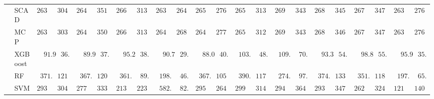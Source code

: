 \begin{tabular}{p{0.2cm}p{1cm}|p{0.6cm}p{0.6cm}|p{0.6cm}p{0.6cm}p{0.6cm}p{0.6cm}p{0.6cm}p{0.6cm}|p{0.6cm}p{0.6cm}p{0.6cm}p{0.6cm}p{0.6cm}p{0.6cm}|p{0.6cm}p{0.6cm}p{0.6cm}p{0.6cm}p{0.6cm}p{0.6cm}}
 & SCAD  & $2637.34$ & $304.57$ & $2643.80$ & $351.02$ & $2663.38$ & $313.00$ & $2631.89$ & $264.31$ & $2651.19$ & $276.21$ & $2658.69$ & $313.58$ & $2692.91$ & $343.54$ & $2683.60$ & $345.53$ & $2677.31$ & $347.32$ & $2638.15$ & $276.77$ \\
 & MCP  & $2635.39$ & $303.10$ & $2644.36$ & $350.02$ & $2665.88$ & $313.43$ & $2640.00$ & $268.58$ & $2648.63$ & $277.54$ & $2657.11$ & $312.85$ & $2697.34$ & $343.94$ & $2681.20$ & $346.18$ & $2676.51$ & $347.17$ & $2639.24$ & $276.32$ \\
 & XGBoost  & $\phantom{00}91.99$ & $\phantom{0}36.47$ & $\phantom{00}89.95$ & $\phantom{0}37.57$ & $\phantom{00}95.22$ & $\phantom{0}38.79$ & $\phantom{00}90.70$ & $\phantom{0}29.18$ & $\phantom{00}88.05$ & $\phantom{0}40.05$ & $\phantom{0}103.18$ & $\phantom{0}48.16$ & $\phantom{0}109.84$ & $\phantom{0}70.38$ & $\phantom{00}93.38$ & $\phantom{0}54.03$ & $\phantom{00}98.81$ & $\phantom{0}55.42$ & $\phantom{00}95.99$ & $\phantom{0}35.67$ \\
 & RF  & $\phantom{0}371.61$ & $121.81$ & $\phantom{0}367.47$ & $120.90$ & $\phantom{0}361.20$ & $\phantom{0}89.39$ & $\phantom{0}198.64$ & $\phantom{0}46.92$ & $\phantom{0}367.37$ & $105.97$ & $\phantom{0}390.42$ & $117.24$ & $\phantom{0}274.09$ & $\phantom{0}97.04$ & $\phantom{0}374.79$ & $133.72$ & $\phantom{0}351.17$ & $118.05$ & $\phantom{0}197.82$ & $\phantom{0}65.85$ \\
 & SVM  & $2935.73$ & $304.45$ & $2773.80$ & $333.73$ & $2134.83$ & $223.66$ & $\phantom{0}582.15$ & $\phantom{0}82.33$ & $2953.28$ & $264.04$ & $2993.89$ & $314.79$ & $2947.32$ & $364.92$ & $2935.84$ & $347.39$ & $2629.77$ & $324.09$ & $1213.28$ & $140.09$ \\
\hline 
\end{tabular}

